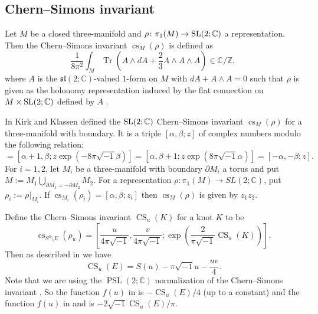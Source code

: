 \documentclass[a4paper]{amsart}
\theoremstyle{plain}
\theoremstyle{definition}
\theoremstyle{remark}
\newcommand{\Z}{\mathbb{Z}}
\newcommand{\C}{\mathbb{C}}
\newcommand{\CS}{\operatorname{CS}}
\newcommand{\cs}{\operatorname{cs}}
\newcommand{\SL}{\rm{SL}}
\newcommand{\Tr}{\operatorname{Tr}}
\numberwithin{equation}{section}
\begin{document}
\subsection{Chern--Simons invariant}
Let $M$ be a closed three-manifold and $\rho\colon\pi_1(M)\to\SL(2;\C)$ a representation.
Then the Chern--Simons invariant $\cs_{M}(\rho)$ is defined as
\begin{equation*}
  \frac{1}{8\pi^2}\int_{M}\Tr(A\wedge dA+\frac{2}{3}A\wedge A\wedge A)
  \in\C/\Z,
\end{equation*}
where $A$ is the $\mathfrak{sl}(2;\C)$-valued $1$-form on $M$ with $dA+A\wedge A=0$ such that $\rho$ is given as the holonomy representation induced by the flat connection on $M\times\SL(2;\C)$ defined by $A$ .
\par
In \cite{Kirk/Klassen:COMMP93} Kirk and Klassen defined the $\SL(2;\C)$ Chern--Simons invariant $\cs_M(\rho)$ for a three-manifold with boundary.
It is a triple $[\alpha,\beta;z]$ of complex numbers modulo the following relation:
\begin{equation*}
  [\alpha,\beta;z]
  =
  [\alpha+1,\beta;z\exp(-8\pi\sqrt{-1}\beta)]
  =
  [\alpha,\beta+1;z\exp(8\pi\sqrt{-1}\alpha)]
  =
  [-\alpha,-\beta;z].
\end{equation*}
For $i=1,2$, let $M_i$ be a three-manifold with boundary $\partial{M_i}$ a torus and put $M:=M_1\bigcup_{\partial{M_1}=-\partial{M_2}}M_2$.
For a representation $\rho\colon\pi_1(M)\to SL(2;\C)$, put $\rho_i:=\rho\bigr|_{M_i}$.
If $\cs_{M_i}(\rho_i)=[\alpha,\beta;z_i]$ then  $\cs_M(\rho)$ is given by $z_1z_2$.
\par
Define the Chern--Simons invariant $\CS_u(K)$ for a knot $K$ to be
\begin{equation*}
  \cs_{S^3\setminus{E}}(\rho_u)
  =
  \left[
    \frac{u}{4\pi\sqrt{-1}},
    \frac{v}{4\pi\sqrt{-1}};
    \exp
    \left(
      \frac{2}{\pi\sqrt{-1}}\CS_{u}(K)
    \right)
  \right].
\end{equation*}
Then as described in \cite{Hikami/Murakami:Bonn} we have
\begin{equation*}
   \CS_{u}(E)
   =
   S(u)-\pi\sqrt{-1}u-\frac{uv}{4}.
\end{equation*}
Note that we are using the $\operatorname{PSL}(2;\C)$ normalization of the Chern--Simons invariant \cite[P.~543]{Kirk/Klassen:COMMP93}.
So the function $f(u)$ in \cite{Neumann/Zagier:TOPOL85} is $-\CS_u(E)/4$ (up to a constant) and the function $f(u)$ in \cite[P.~543]{Kirk/Klassen:COMMP93} and \cite{Yoshida:INVEM85} is $-2\sqrt{-1}\CS_u(E)/\pi$.
\end{document}
